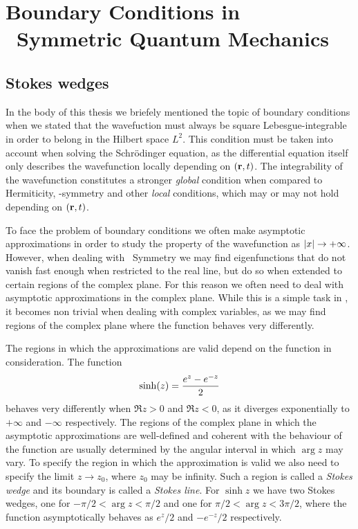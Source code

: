 \chapter[Boundary Conditions in \PT\ Symmetric Quantum Mechanics][Boundary Conditions]{Boundary Conditions in \PT\ Symmetric Quantum Mechanics}\label{a:stokes}
    \section*{Stokes wedges}
        In the body of this thesis we briefely mentioned the topic of boundary conditions when we stated that the wavefuction must always be square Lebesgue-integrable in order to belong in the Hilbert space $L^2$. This condition must be taken into account when solving the Schr\"odinger equation, as the differential equation itself only describes the wavefunction locally depending on $\pqty{\vb{r},t}$. The integrability of the wavefunction constitutes a stronger \emph{global} condition when compared to Hermiticity, \PT-symmetry and other \emph{local} conditions, which may or may not hold depending on $\pqty{\vb{r},t}$.

        To face the problem of boundary conditions we often make asymptotic approximations in order to study the property of the wavefunction as $\abs{x}\to+\infty$. However, when dealing with \PT\ Symmetry we may find eigenfunctions that do not vanish fast enough when restricted to the real line, but do so when extended to certain regions of the complex plane. For this reason we often need to deal with asymptotic approximations in the complex plane. While this is a simple task in \bbR, it becomes non trivial when dealing with complex variables, as we may find regions of the complex plane where the function behaves very differently.

        The regions in which the approximations are valid depend on the function in consideration. The function
        \begin{align*}
            \sinh\!\pqty{z} = \frac{e^z - e^{-z}}{2}
        \end{align*}
        behaves very differently when $\Re z > 0$ and $\Re z < 0$, as it diverges exponentially to $+\infty$ and $-\infty$ respectively. The regions of the complex plane in which the asymptotic approximations are well-defined and coherent with the behaviour of the function are usually determined by the angular interval in which $\arg z$ may vary. To specify the region in which the approximation is valid we also need to specify the limit $z \to z_0$, where $z_0$ may be infinity. Such a region is called a \emph{Stokes wedge} and its boundary is called a \emph{Stokes line}. For $\sinh z$ we have two Stokes wedges, one for $-\pi/2 < \arg z < \pi/2$ and one for $\pi/2 < \arg z < 3\pi/2$, where the function asymptotically behaves as $e^z/2$ and $-e^{-z}/2$ respectively. 

